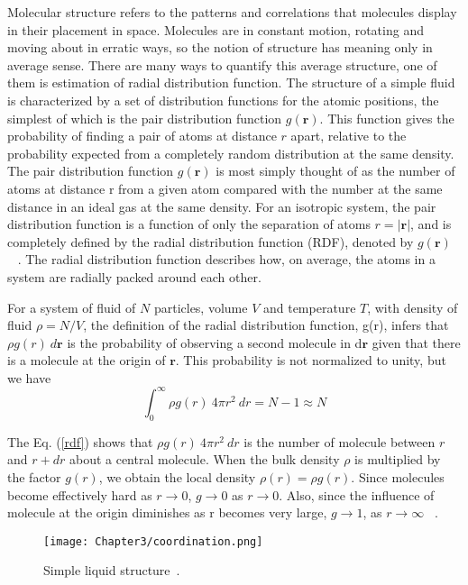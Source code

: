  Molecular structure refers to the patterns and correlations that molecules display in
 their placement in space. Molecules are in constant motion, rotating and moving about in erratic ways, so the notion of structure has meaning only in average sense. There
 are many ways to quantify this average structure, one of them is estimation  of radial distribution function. The structure of a simple fluid is characterized by a set of distribution functions for the atomic positions, the simplest of which is the pair distribution function $g(\mathbf{r})$. This function gives the probability of finding a pair of atoms at distance $r$ apart, relative to the probability expected from a completely random distribution at the same density. The pair distribution function $g(\mathbf{r})$ is most simply thought of as the  number of atoms at distance r from a given atom compared with the number at the same distance in an ideal gas at the same density. For an isotropic system, the pair distribution function is a function of only the separation of atoms $r = \lvert\mathbf{r}\rvert $, and is completely defined by the radial distribution function (RDF), denoted by $g(\mathbf{r})$ ~ \citep{Allen1989}. The radial distribution function describes how, on average, the atoms in a system are radially packed around each other.
 
 For a system of fluid of  $N$ particles, volume $V$ and temperature $T$, with density of fluid $\rho = N/V$, the definition of the radial distribution function, g(r),
 infers that $\rho g(r)~d\mathbf{r}$ is the probability of observing  a second molecule in d$\mathbf{r}$  given that there is a molecule at the origin of $\mathbf{r}$. This probability is not normalized to unity, but we have 
 \begin{equation}\label{rdf}
 \int_0^\infty \rho g(r)~4\pi r^2~dr = N-1 \approx N
 \end{equation}
 
 The Eq. (\ref{rdf}) shows that $\rho g(r)~4\pi r^2~dr $   is the number of
 molecule between $r$ and $r + dr$ about a central molecule. When the bulk density $\rho$ is multiplied by the factor $g(r)$, we obtain the  local density $\rho(r) = \rho g(r)$. Since molecules become effectively hard  as $r \longrightarrow 0$, $g \longrightarrow 0$ as $r \longrightarrow 0$. Also, since the influence of molecule at the origin diminishes as r becomes very large, $g \longrightarrow 1$, as $r \longrightarrow \infty$ ~\citep{mcquarrie2000}.
 
 \begin{figure}[h!]
 \centering
 \texttt{[image: Chapter3/coordination.png]}
 \caption[Simple liquid structure.]{Simple liquid structure~\citep{chandler1987}.}
  \label{coordinationfig} 
 \end{figure}
 
